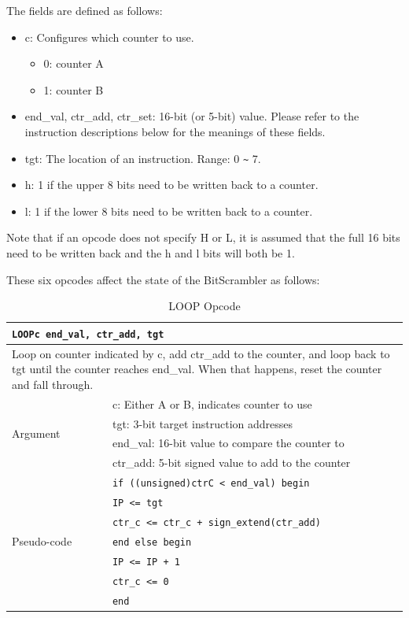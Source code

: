 \documentclass[main\_\_EN.tex]{subfiles}
\begin{document}
The fields are defined as follows:


\begin{itemize}\item c: Configures which counter to use.
\begin{itemize}
    \item 0: counter A
    \item 1: counter B
\end{itemize}
\item end\_val, ctr\_add, ctr\_set: 16-bit (or 5-bit) value. Please refer to the instruction descriptions below for the meanings of these fields.
\item tgt: The location of an instruction. Range: 0 \verb+~+ 7.
\item h: 1 if the upper 8 bits need to be written back to a counter.
\item l: 1 if the lower 8 bits need to be written back to a counter.
\end{itemize}

Note that if an opcode does not specify H or L, it is assumed that the full 16 bits need to be written back and the h and l bits will both be 1.

These six opcodes affect the state of the BitScrambler as follows:

\begin{table}[H]
\caption{LOOP Opcode}
\label{tab:bitscrm-loop-opcode}
\begin{tabular}{|l|l|}
\hline
\multicolumn{2}{|l|}{\texttt{LOOPc end\_val, ctr\_add, tgt}} \\
\hline
\multicolumn{2}{|L{17cm}|}{Loop on counter indicated by c, add ctr\_add to the counter, and loop back to tgt until the counter reaches end\_val. When that happens, reset the counter and fall through.} \\
\hline
\multirow{4}{*}{Argument} & c: Either A or B, indicates counter to use \\
& tgt: 3-bit target instruction addresses \\
& end\_val: 16-bit value to compare the counter to \\
& ctr\_add: 5-bit signed value to add to the counter \\
\hline
\multirow{7}{*}{Pseudo-code} & \texttt{if ((unsigned)ctrC < end\_val) begin} \\
& \hspace*{4mm} \texttt{IP <= tgt} \\
& \hspace*{4mm} \texttt{ctr\_c <= ctr\_c + sign\_extend(ctr\_add)} \\
& \texttt{end else begin} \\
& \hspace*{4mm} \texttt{IP <= IP + 1} \\
& \hspace*{4mm} \texttt{ctr\_c <= 0} \\
& \texttt{end} \\
\hline
\end{tabular}
\end{table}
\end{document}
